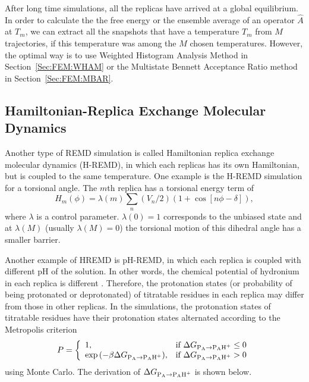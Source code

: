After long time simulations, all the replicas have arrived at a global equilibrium. In order to calculate the the free energy or the ensemble average of an operator $\hat A$ at $T_m$, we can extract all the snapshots that have a temperature $T_m$ from $M$ trajectories, if this temperature was among the $M$ chosen temperatures. However, the optimal way is to use Weighted Histogram Analysis Method in Section~\ref{Sec:FEM:WHAM} or the Multistate Bennett Acceptance Ratio method in Section~\ref{Sec:FEM:MBAR}.  

\subsection{Hamiltonian-Replica Exchange Molecular Dynamics\label{Sec:ES:REMD:HREMD}}
Another type of REMD simulation is called Hamiltonian replica exchange molecular dynamics (H-REMD), in which each replicas has its own Hamiltonian, but is coupled to the same temperature. One example is the H-REMD simulation for a torsional angle. The $m$th replica has a torsional energy term of 
\begin{equation}
	H_m(\phi)=\lambda(m)\sum_n\left(V_n/2\right)\left(1+\cos{\left[n\phi-\delta\right]}\right),
\end{equation}
where $\lambda$ is a control parameter. $\lambda(0)=1$ corresponds to the unbiased state and at $\lambda(M)$ (usually $\lambda(M)=0$) the torsional motion of this dihedral angle has a smaller barrier.

Another example of HREMD is pH-REMD, in which each replica is coupled with different pH of the solution. In other words, the chemical potential of hydronium in each replica is different . Therefore, the protonation states (or probability of being protonated or deprotonated) of titratable residues in each replica may differ from those in other replicas. In the simulations, the protonation states of titratable residues have their protonation states alternated according to the Metropolis criterion
\begin{equation}
	P= 
	\left\{ 
	\begin{array}{ll} 
		1, & \text{if } \Delta G_{\ce{P_{A}}\rightarrow \ce{P_{A}H^{+}}}\leq 0\\ 
		\exp{(-\beta\Delta G_{\ce{P_{A}}\rightarrow \ce{P_{A}H^{+}}})}, & \text{if }\Delta G_{\ce{P_{A}}\rightarrow \ce{P_{A}H^{+}}} >0\\  
	\end{array} 
	\right. 
\end{equation}
using Monte Carlo. The derivation of $\Delta G_{\ce{P_{A}}\rightarrow \ce{P_{A}H^{+}}}$ is shown below. 

